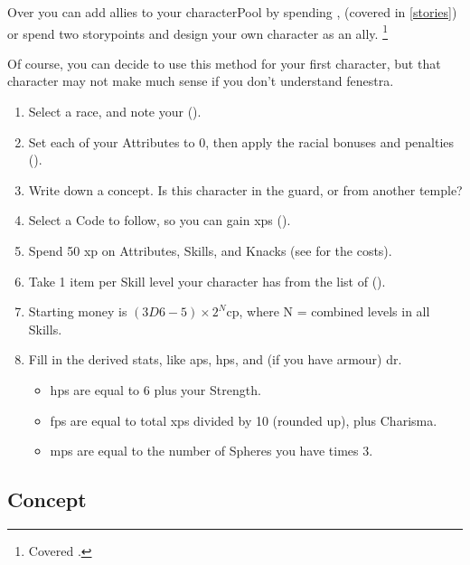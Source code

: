 \begin{multicols}{2}

\label{playerchosen}

\noindent
Over  you can add allies to your \gls{characterPool} by spending ,
(covered in \autoref{stories})
or spend two \glspl{storypoint} and design your own character as an ally.%
\footnote{Covered .}

Of course, you can decide to use this method for your first character, but that character may not make much sense if you don't understand \gls{fenestra}.

\begin{enumerate}
  \item\label{sumCCrace}
  Select a race, and note your  ().
  \item\label{sumCCatt}
  Set each of your Attributes to 0, then apply the racial bonuses and penalties ().
  \item\label{sumCCconcept}
  Write down a concept.
  Is this character in the \gls{guard}, or from another temple?
  \item\label{sumCCcode}
  Select a Code to follow, so you can gain \glspl{xp} ().
  \item\label{sumCCxp}
  Spend 50 \gls{xp} on Attributes, Skills, and Knacks (see  for the costs).
  \item\label{sumCCequip}
  Take 1 item per Skill level your character has from the list of  ().
  \item\label{sumCCcoin}
  Starting money is $(3D6-5)\times 2^N$\gls{cp}, where N = combined levels in all Skills.
  \item\label{sumCCder}
  Fill in the derived stats, like \glspl{ap}, \glspl{hp}, and (if you have armour) \gls{dr}.
  \begin{itemize}
    \item
    \glspl{hp} are equal to 6 plus your Strength.
    \item
    \glspl{fp} are equal to total \glspl{xp} divided by 10 (rounded up), plus Charisma.
    \item
    \glspl{mp} are equal to the number of Spheres you have times 3.
  \end{itemize}
\end{enumerate}

\subsection{Concept}


\end{multicols}
